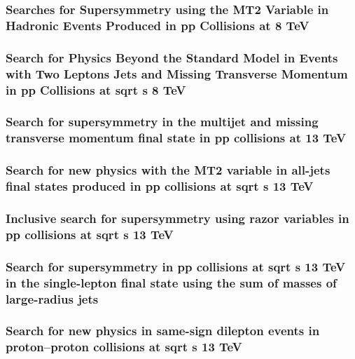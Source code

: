 \documentclass[a4paper, 11pt, twoside, openright]{report}
\begin{document}
\subsubsection{Searches for Supersymmetry using the MT2 Variable in Hadronic Events Produced in pp Collisions at 8 TeV}
%
\subsubsection{Search for Physics Beyond the Standard Model in Events with Two Leptons Jets and Missing Transverse Momentum in pp Collisions at sqrt s 8 TeV}
%
\subsubsection{Search for supersymmetry in the multijet and missing transverse momentum final state in pp collisions at 13 TeV}
%
\subsubsection{Search for new physics with the MT2 variable in all-jets final states produced in pp collisions at sqrt s 13 TeV}
%
\subsubsection{Inclusive search for supersymmetry using razor variables in pp collisions at  sqrt s 13 TeV}
%
\subsubsection{Search for supersymmetry in pp collisions at sqrt s 13 TeV in the single-lepton final state using the sum of masses of large-radius jets}
%
\subsubsection{Search for new physics in same-sign dilepton events in proton–proton collisions at sqrt s 13 TeV}
%
\end{document}
